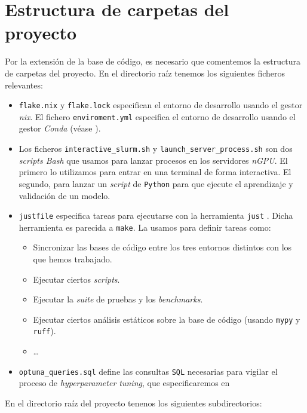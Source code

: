 \section{Estructura de carpetas del proyecto} \label{isec:estructura_carpetas}

Por la extensión de la base de código, es necesario que comentemos la estructura de carpetas del proyecto. En el directorio raíz tenemos los siguientes ficheros relevantes:

\begin{itemize}
	\item \lstinline{flake.nix} y \lstinline{flake.lock} especifican el entorno de desarrollo usando el gestor \textit{nix}. El fichero \lstinline{enviroment.yml} especifica el entorno de desarrollo usando el gestor \textit{Conda} (véase ).
	\item Los ficheros \lstinline{interactive_slurm.sh} y \lstinline{launch_server_process.sh} son dos \textit{scripts Bash} que usamos para lanzar procesos en los servidores \textit{nGPU}. El primero lo utilizamos para entrar en una terminal de forma interactiva. El segundo, para lanzar un \textit{script} de \lstinline{Python} para que ejecute el aprendizaje y validación de un modelo.
	\item \lstinline{justfile} especifica tareas para ejecutarse con la herramienta \lstinline{just} \cite{informatica:just}. Dicha herramienta es parecida a \lstinline{make}. La usamos para definir tareas como:
	      \begin{itemize}
		      \item Sincronizar las bases de código entre los tres entornos distintos con los que hemos trabajado.
		      \item Ejecutar ciertos \textit{scripts}.
		      \item Ejecutar la \textit{suite} de pruebas y los \textit{benchmarks}.
		      \item Ejecutar ciertos análisis estáticos sobre la base de código (usando \lstinline{mypy} y \lstinline{ruff}).
		      \item \ldots
	      \end{itemize}
	\item \lstinline{optuna_queries.sql} define las consultas \lstinline{SQL} necesarias para vigilar el proceso de \textit{hyperparameter tuning}, que especificaremos en 
\end{itemize}

En el directorio raíz del proyecto tenenos los siguientes subdirectorios:

